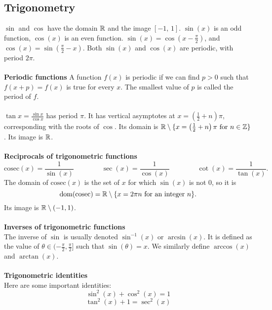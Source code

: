 \documentclass[10pt, a4paper]{article}
\begin{document}
\subsection{Trigonometry}
$\sin$ and $\cos$ have the domain $\mathbb{R}$ and the image $[-1,\,1]$. $\sin{(x)}$ is an odd function, $\cos{(x)}$ is an even function. $\sin{(x)} = \cos{(x - \frac{\pi}{2})}$, and $\cos{(x)} = \sin{(\frac{\pi}{2} - x)}$. Both $\sin{(x)}$ and $\cos{(x)}$ are periodic, with period $2\pi$. \\
\\
\textbf{Periodic functions} A function $f(x)$ is periodic if we can find $p > 0$ such that $f(x + p) = f(x)$ is true for every $x$. The smallest value of $p$ is called the period of $f$. \\
\\
$\tan{x} = \frac{\sin{x}}{\cos{x}}$ has period $\pi$. It has vertical asymptotes at $x = \left(\frac{1}{2} + n\right)\pi$, corresponding with the roots of $\cos$. Its domain is $\mathbb{R} \setminus \{x = \left(\frac{1}{2} + n\right)\pi\textnormal{ for } n \in \mathbb{Z}\}$. Its image is $\mathbb{R}$. \\
\\
\textbf{Reciprocals of trigonometric functions} \\
\[
    \mathrm{cosec}{(x)} = \dfrac{1}{\sin{(x)}} \qquad \qquad \sec{(x)} = \dfrac{1}{\cos{(x)}} \qquad \qquad \cot{(x)} = \dfrac{1}{\tan{(x)}}.
\]
The domain of $\mathrm{cosec}(x)$ is the set of $x$ for which $\sin{(x)}$ is not $0$, so it is
\[
\mathrm{dom}(\mathrm{cosec}) = \mathbb{R} \setminus \{x = 2\pi n \textnormal{ for an integer } n\}.
\]
Its image is $\mathbb{R} \setminus (-1, 1)$. \\
\\
\textbf{Inverses of trigonometric functions} \\
The inverse of $\sin$ is usually denoted $\sin^{-1}(x)$ or $\arcsin(x)$. It is defined as the value of $\theta \in (-\frac{\pi}{2}, \frac{\pi}{2}]$ such that $\sin(\theta) = x$. We similarly define $\arccos(x)$ and $\arctan(x)$. \\
\\
\textbf{Trigonometric identities} \\
Here are some important identities:
\[
\sin^2(x) + \cos^2(x) = 1
\]
\[
\tan^2(x) + 1 = \sec^2(x)
\]
\end{document}
